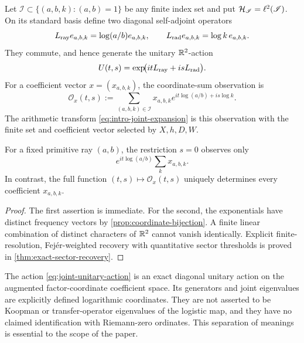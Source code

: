 Let $\mathscr I\subset\{(a,b,k):(a,b)=1\}$ be any finite index set and
put $\mathcal H_{\mathscr I}=\ell^2(\mathscr I)$.  On its standard basis define
two diagonal self-adjoint operators
\begin{equation}
 L_{\rm ray}e_{a,b,k}=\log(a/b)e_{a,b,k},
 \qquad
 L_{\rm rad}e_{a,b,k}=\log k\,e_{a,b,k}.
 \label{eq:joint-generators}
\end{equation}
They commute, and hence generate the unitary $\mathbb R^2$-action
\begin{equation}
 U(t,s)=\exp\!\bigl(i tL_{\rm ray}+i sL_{\rm rad}\bigr).
 \label{eq:joint-unitary-action}
\end{equation}
For a coefficient vector $x=(x_{a,b,k})$, the coordinate-sum observation
is
\begin{equation}
 \mathscr O_x(t,s)
 :=\sum_{(a,b,k)\in\mathscr I}
 x_{a,b,k}e^{it\log(a/b)+is\log k}.
 \label{eq:coordinate-sum-observation}
\end{equation}
The arithmetic transform \eqref{eq:intro-joint-expansion} is this
observation with the finite set and coefficient vector selected by
$X,h,D,W$.

\begin{proposition}
\label{prop:projection-and-completeness}
For a fixed primitive ray $(a,b)$, the restriction $s=0$ observes only
\begin{equation}
 e^{it\log(a/b)}\sum_kx_{a,b,k}.
 \label{eq:one-coordinate-fibre-sum}
\end{equation}
In contrast, the full function $(t,s)\mapsto\mathscr O_x(t,s)$ uniquely
determines every coefficient $x_{a,b,k}$.
\end{proposition}

\begin{proof}
The first assertion is immediate.  For the second, the exponentials have
distinct frequency vectors by \cref{prop:coordinate-bijection}.  A
finite linear combination of distinct characters of $\mathbb R^2$ cannot
vanish identically.  Explicit finite-resolution, Fej\'er-weighted
recovery with quantitative sector thresholds is proved in
\cref{thm:exact-sector-recovery}.
\end{proof}

\begin{remark}
The action \eqref{eq:joint-unitary-action} is an exact diagonal unitary
action on the augmented factor-coordinate coefficient space.  Its generators and joint
eigenvalues are explicitly defined logarithmic coordinates.  They are
not asserted to be Koopman or transfer-operator eigenvalues of the
logistic map, and they have no claimed identification with Riemann-zero
ordinates.  This separation of meanings is essential to the scope of
the paper.
\end{remark}

